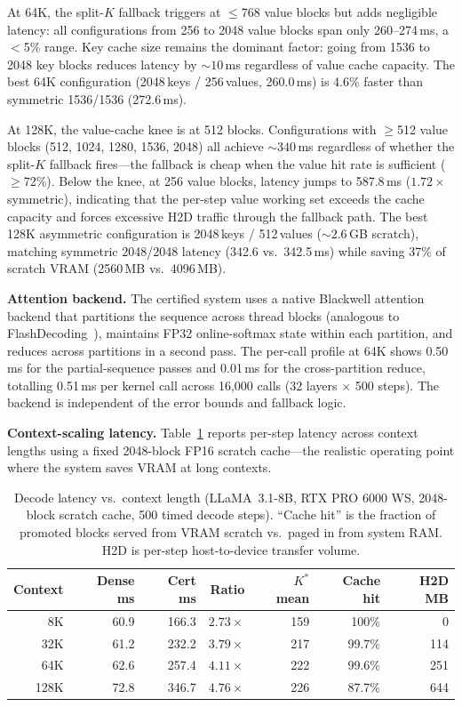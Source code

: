 \documentclass[10pt,twocolumn,a4paper]{article}
\theoremstyle{definition}
\theoremstyle{remark}
\begin{document}
At 64K, the split-$K$ fallback triggers at $\leq$768 value blocks but adds negligible latency: all configurations from 256 to 2048 value blocks span only 260--274\,ms, a $<$5\% range.  Key cache size remains the dominant factor: going from 1536 to 2048 key blocks reduces latency by ${\sim}10$\,ms regardless of value cache capacity.  The best 64K configuration (2048\,keys / 256\,values, 260.0\,ms) is 4.6\% faster than symmetric 1536/1536 (272.6\,ms).

At 128K, the value-cache knee is at 512 blocks.  Configurations with $\geq$512 value blocks (512, 1024, 1280, 1536, 2048) all achieve ${\sim}340$\,ms regardless of whether the split-$K$ fallback fires---the fallback is cheap when the value hit rate is sufficient ($\geq$72\%).  Below the knee, at 256 value blocks, latency jumps to 587.8\,ms ($1.72\times$ symmetric), indicating that the per-step value working set exceeds the cache capacity and forces excessive H2D traffic through the fallback path.  The best 128K asymmetric configuration is 2048\,keys / 512\,values (${\sim}2.6$\,GB scratch), matching symmetric 2048/2048 latency (342.6 vs.\ 342.5\,ms) while saving 37\% of scratch VRAM (2560\,MB vs.\ 4096\,MB).

\textbf{Attention backend.}  The certified system uses a native Blackwell attention backend that partitions the sequence across thread blocks (analogous to FlashDecoding~\cite{flashinfer}), maintains FP32 online-softmax state within each partition, and reduces across partitions in a second pass.  The per-call profile at 64K shows 0.50\,ms for the partial-sequence passes and 0.01\,ms for the cross-partition reduce, totalling 0.51\,ms per kernel call across 16{,}000 calls (32 layers $\times$ 500 steps).  The backend is independent of the error bounds and fallback logic.

\textbf{Context-scaling latency.}  Table~\ref{tab:context_scaling} reports per-step latency across context lengths using a fixed 2048-block FP16 scratch cache---the realistic operating point where the system saves VRAM at long contexts.

\begin{table}[!t]
\centering
\caption{Decode latency vs.\ context length (LLaMA~3.1-8B, RTX PRO 6000 WS, 2048-block scratch cache, 500 timed decode steps).  ``Cache hit'' is the fraction of promoted blocks served from VRAM scratch vs.\ paged in from system RAM\@.  H2D is per-step host-to-device transfer volume.}
\label{tab:context_scaling}
\small
\begin{tabular}{rrrrrrr}
\toprule
\textbf{Context} & \textbf{Dense ms} & \textbf{Cert ms} & \textbf{Ratio} & \textbf{$K^*$ mean} & \textbf{Cache hit} & \textbf{H2D MB} \\
\midrule
8K   & 60.9 & 166.3  & $2.73\times$ & 159 & 100\%  & 0 \\
32K  & 61.2 & 232.2  & $3.79\times$ & 217 & 99.7\% & 114 \\
64K  & 62.6 & 257.4  & $4.11\times$ & 222 & 99.6\% & 251 \\
128K & 72.8 & 346.7  & $4.76\times$ & 226 & 87.7\% & 644 \\
\bottomrule
\end{tabular}
\end{table}
\end{document}
